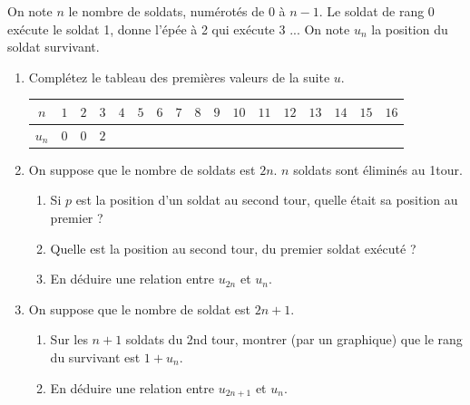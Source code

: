 \documentclass[main.tex]{subfiles}
\begin{document}
\begin{exercise}
\begin{problem}
On note $n$ le nombre de soldats, numérotés de $0$ à $n-1$. Le soldat de rang 0 exécute le soldat 1, donne l'épée à 2 qui exécute 3 ... On note $u_n$ la position du soldat survivant.   
\begin{enumerate}[label=\arabic*),leftmargin=*] 
	\item Complétez le tableau des premières valeurs de la suite $u$.\\ 
	\renewcommand{\arraystretch}{1.5}
\begin{tabularx}{0.99\linewidth}{|c|*{16}{Y|}} \hline   
$n$ & $1$ & $2$ & $3$ & $4$ & $5$ & $6$ & $7$ & $8$& $9$ & $10$& $11$& $12$& $13$& $14$ & $15$ & $16$\\ \hline    
$u_n$ & $0$ & $0$ & $2$ &   &   &  &   & & &&&&&&&\\ \hline   
\end{tabularx}	 
\item 	
	On suppose que le nombre de soldats est $2n$. $n$ soldats sont éliminés au 1\ier tour.
	\begin{enumerate}[label=\alph*),leftmargin=*] 
		\item Si $p$ est la position d'un soldat au second tour, quelle était sa position au premier ? 
		\item Quelle est la position au second tour, du premier soldat exécuté ? 
		\item En déduire une relation entre $u_{2n}$ et $u_n$.
	\end{enumerate}
\item On suppose que le nombre de soldat est $2n+1$.  
\begin{enumerate}[label=\alph*),leftmargin=*] 
	\item Sur les $n+1$ soldats du 2nd tour, montrer (par un graphique) que le rang du survivant est $1+u_n$.
	\item En déduire une relation entre $u_{2n+1}$ et $u_{n}$.
\end{enumerate}

\end{enumerate}
\end{problem}
\end{exercise}
\end{document}
